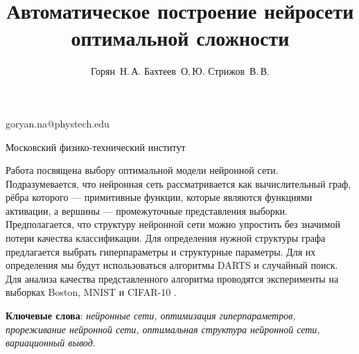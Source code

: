 \documentclass[12pt,twoside]{article}
\begin{document}
\title
    {Автоматическое построение нейросети оптимальной сложности}
\author
    {Горян~Н.\,А. Бахтеев~О.\,Ю.  Стрижов~В.\,В.} %
\email
    {goryan.na@phystech.edu}

\organization
    {Московский физико-технический институт}
\abstract
	{Работа посвящена выбору оптимальной модели нейронной сети. Подразумевается, что нейронная сеть рассматривается как вычислительный граф, рёбра которого --- примитивные функции, которые являются функциями активации, а вершины --- промежуточные представления выборки. Предполагается, что структуру нейронной сети можно упростить без значимой потери качества классификации. Для определения нужной структуры графа предлагается выбрать гиперпараметры и структурные параметры. Для их определения мы будут использоваться алгоритмы DARTS и случайный поиск. Для анализа качества представленного алгоритма проводятся эксперименты на выборках Boston, MNIST и CIFAR-10 .

\bigskip

\textbf{Ключевые слова}: \emph {нейронные сети, оптимизация гиперпараметров, прореживание нейронной сети, оптимальная структура нейронной сети, вариационный вывод}.
}


\maketitle
\end{document}
